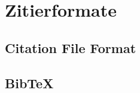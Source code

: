 \section{Zitierformate}
\label{sec:zitierformate}
\subsection{Citation File Format}
\label{subsec:citation-file-format}
\subsection{BibTeX}
\label{subsec:bibtex_format}
